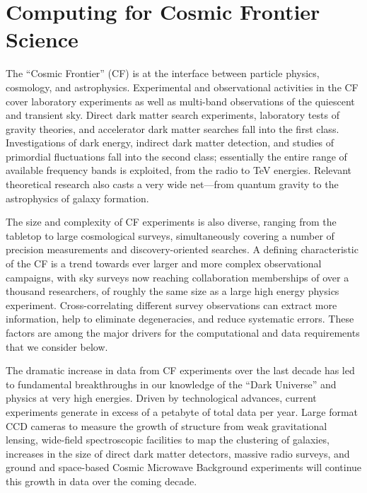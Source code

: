  
\section{Computing for Cosmic Frontier Science}


The ``Cosmic Frontier'' (CF) is at the interface
between particle physics, cosmology, and astrophysics. 
Experimental and observational activities in the CF cover
laboratory experiments as well as multi-band observations of the
quiescent and transient sky. 
Direct dark matter search experiments,
laboratory tests of gravity theories, and accelerator dark matter
searches fall into the first class. Investigations of dark energy,
indirect dark matter detection, and studies of primordial fluctuations
fall into the second class; essentially the entire range of available
frequency bands is exploited, from the radio to TeV energies. Relevant
theoretical research also casts a very wide net---from quantum
gravity to the astrophysics of galaxy formation.

The size and complexity of CF experiments is also
diverse, ranging from the tabletop to large cosmological surveys,
simultaneously covering a number of precision measurements and
discovery-oriented searches. A defining characteristic of the CF 
is a trend towards ever larger and more complex observational
campaigns, with sky surveys now reaching collaboration memberships of
over a thousand researchers, of roughly the same size as a large high
energy physics experiment. Cross-correlating different survey
observations can extract more information, help to eliminate
degeneracies, and reduce systematic errors. These factors are among
the major drivers for the computational and data requirements that we
consider below.


The dramatic increase in data from CF experiments over
the last decade has led to fundamental breakthroughs in our knowledge
of the ``Dark Universe'' and physics at very high energies. Driven by
technological advances, current experiments generate in excess of a
petabyte of total data per year. Large format CCD cameras to measure
the growth of structure from weak gravitational lensing, wide-field
spectroscopic facilities to map the clustering of galaxies, increases
in the size of direct dark matter detectors, massive radio surveys,
and ground and space-based Cosmic Microwave Background 
experiments will continue this growth in data over the coming decade.

